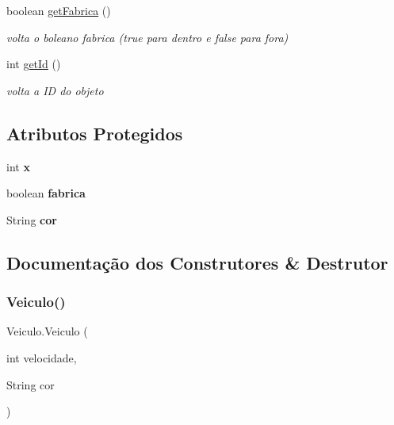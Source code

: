 \begin{DoxyCompactItemize}
\mbox{\label{class_veiculo_a6447f0eeb99399f1f96e835c22a88479}} 
boolean \mbox{\hyperlink{class_veiculo_a6447f0eeb99399f1f96e835c22a88479}{get\+Fabrica}} ()
\begin{DoxyCompactList}\small\item\em volta o boleano fabrica (true para dentro e false para fora) \end{DoxyCompactList}\item 
\mbox{\label{class_veiculo_a09c389362736b3ca90a0200e01545e73}} 
int \mbox{\hyperlink{class_veiculo_a09c389362736b3ca90a0200e01545e73}{get\+Id}} ()
\begin{DoxyCompactList}\small\item\em volta a ID do objeto \end{DoxyCompactList}\end{DoxyCompactItemize}
\subsection*{Atributos Protegidos}
\begin{DoxyCompactItemize}
\item 
\mbox{\label{class_veiculo_a069917a284297fe5b385258b2afd9ad6}} 
int {\bfseries x}
\item 
\mbox{\label{class_veiculo_a23d377a69bdf558ebedb5bc35dcdebf5}} 
boolean {\bfseries fabrica}
\item 
\mbox{\label{class_veiculo_a6bc5886e61340672e69bd638936ec1d5}} 
String {\bfseries cor}
\end{DoxyCompactItemize}


\subsection{Documentação dos Construtores \& Destrutor}
\mbox{\label{class_veiculo_a6e43a5035741a90e4ef9d07b7fce6c87}} 
\subsubsection{\texorpdfstring{Veiculo()}{Veiculo()}}
{\footnotesize\ttfamily Veiculo.\+Veiculo (\begin{DoxyParamCaption}\item[{int}]{velocidade,  }\item[{String}]{cor }\end{DoxyParamCaption})}



